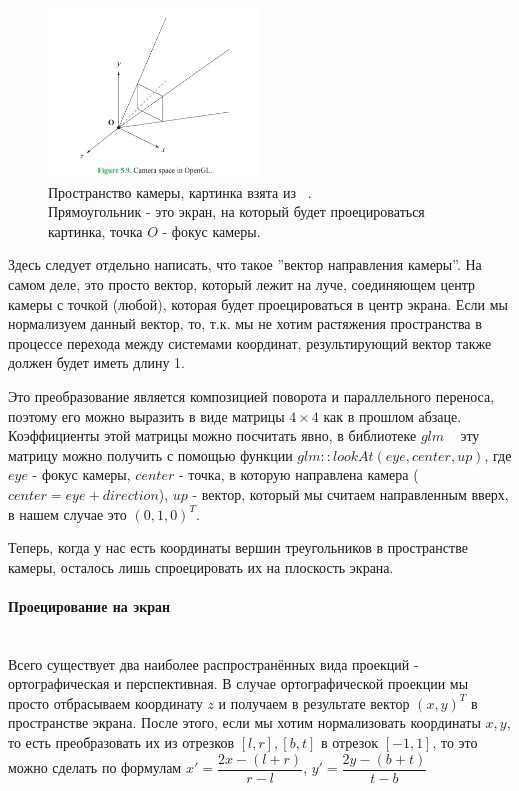 \documentclass{article}
\begin{document}
\begin{figure}
	\caption{Пространство камеры, картинка взята из ~\cite{Math3d}. \\ Прямоугольник - это экран, на который будет проецироваться картинка, точка $O$ - фокус камеры.}
	\includegraphics[width=0.5\textwidth]{img1.png}
\end{figure}

Здесь следует отдельно написать, что такое ''вектор направления камеры''. На самом деле, это  просто вектор, который лежит на луче, соединяющем центр камеры с точкой (любой), которая будет проецироваться в центр экрана. Если мы нормализуем данный вектор, то, т.к. мы не хотим растяжения пространства в процессе перехода между системами координат, результирующий вектор также должен будет иметь длину 1.

Это преобразование является композицией поворота и параллельного переноса, поэтому его можно выразить в виде матрицы $4\times 4$ как в прошлом абзаце. Коэффициенты этой матрицы можно посчитать явно, в библиотеке $glm$ ~\cite{glm} эту матрицу можно получить с помощью функции $glm::lookAt(eye, center, up)$, где $eye$ - фокус камеры, $center$ - точка, в которую направлена камера ($center = eye+direction$), $up$ - вектор, который мы считаем направленным вверх, в нашем случае это $(0, 1, 0)^T$.

Теперь, когда у нас есть координаты вершин треугольников в пространстве камеры, осталось лишь спроецировать их на плоскость экрана.

\paragraph{Проецирование на экран}
$\text{}$\\
Всего существует два наиболее распространённых вида проекций - ортографическая и перспективная. В случае ортографической проекции мы просто отбрасываем координату $z$ и получаем в результате вектор $(x, y)^T$ в пространстве экрана. После этого, если мы хотим нормализовать координаты $x, y$, то есть преобразовать их из отрезков $[l, r], [b, t]$ в отрезок $[-1, 1]$, то это можно сделать по формулам $x'=\dfrac{2x-(l+r)}{r-l}$, $y'=\dfrac{2y-(b+t)}{t-b}$
\end{document}
